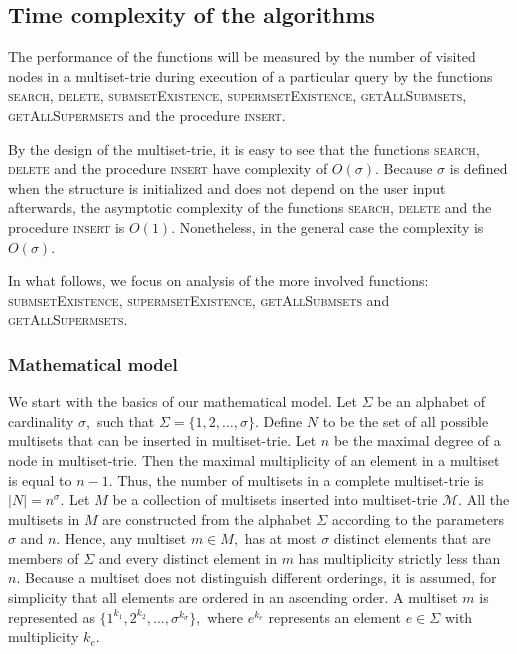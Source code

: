 \documentclass[10pt,letterpaper]{article}
\providecommand{\DIFaddtex}[1]{{\protect\color{blue}\uwave{#1}}} %
\providecommand{\DIFaddbegin}{} %
\providecommand{\DIFaddend}{} %
\providecommand{\DIFadd}[1]{\texorpdfstring{\DIFaddtex{#1}}{#1}} %
\newcommand{\DIFaddincludegraphics}[2][]{{\color{blue}\fbox{\DIFOincludegraphics[#1]{#2}}}} %
\DeclareRobustCommand{\DIFaddbegin}{\DIFOaddbegin \let\includegraphics\DIFaddincludegraphics} %
\DeclareRobustCommand{\DIFaddend}{\DIFOaddend \let\includegraphics\DIFOincludegraphics} %
\begin{document}
\subsection{Time complexity of the algorithms}\label{s:timecomplexity}
The performance of the functions will be measured by the number of 
visited nodes in a multiset-trie during execution of a particular query by the 
functions \textsc{search}, \textsc{delete}, \textsc{submsetExistence}, 
\textsc{supermsetExistence}, \textsc{getAllSubmsets}, \textsc{getAllSupermsets} 
and the procedure \textsc{insert}.
%

By the design of the multiset-trie, it is easy to see that the functions \textsc{search},
\textsc{delete} and the procedure \textsc{insert} have complexity of $O(\sigma).$
Because $\sigma$ is defined when the structure is initialized and does not depend
on the user input afterwards, the asymptotic complexity of the functions \textsc{search}, 
\textsc{delete} and the procedure \textsc{insert} is $O(1).$ Nonetheless, in the general 
case the complexity is $O(\sigma).$

In what follows, we focus on analysis of the more involved functions:
\textsc{submsetExistence}, \textsc{supermsetExistence}, \textsc{getAllSubmsets}
and \textsc{getAllSupermsets}.

\subsubsection{Mathematical model} \label{ss:mathmodel}
We start with the basics of our mathematical model. Let $\Sigma$ be an alphabet of
cardinality $\sigma,$ such that $\Sigma = \{ 1,2, \ldots, \sigma \}.$ Define $N$
to be the set of all possible multisets that can be inserted in \DIFaddbegin \DIFadd{a
}\DIFaddend multiset-trie. Let $n$ be the maximal degree of a node in \DIFaddbegin \DIFadd{a }\DIFaddend multiset-trie.
Then the maximal multiplicity of an element in a multiset is equal to $n-1.$
Thus, the number of multisets in a complete multiset-trie is $ |N| = n^{\sigma}.$
%
Let $M$ be a collection of multisets inserted into multiset-trie $\mathcal{M}.$
All the multisets in $M$ are constructed from the alphabet $\Sigma$ according
to the parameters $\sigma$ and $n$. Hence, any multiset $m\in M,$ 
has at most $\sigma$ distinct elements that are members of $\Sigma$ and 
every distinct element in $m$ has multiplicity strictly less than $n.$
%
Because a multiset does not distinguish different orderings, it is assumed, for
simplicity that all elements are ordered in an ascending order. A multiset $m$ is
represented as $\{1^{k_1},2^{k_2},\ldots, \sigma^{k_\sigma}\},$ where $e^{k_e}$
represents an element $e\in\Sigma$ with multiplicity $k_e.$
%
\end{document}
